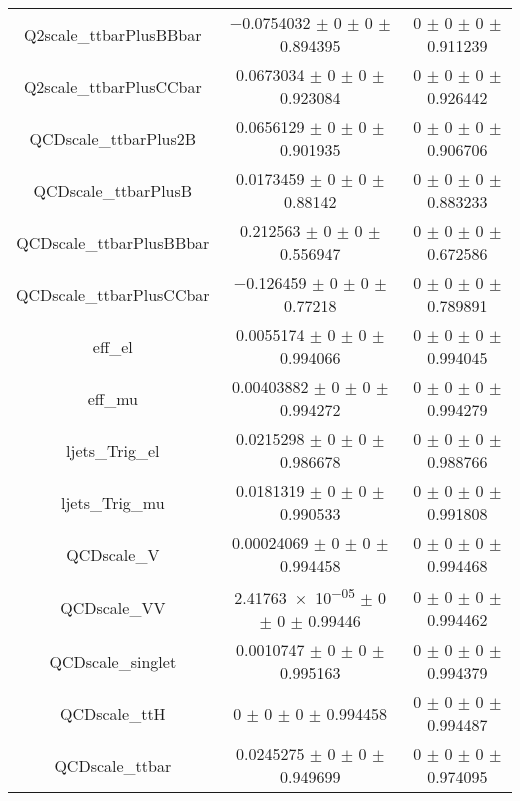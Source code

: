 \begin{table}
\begin{tabular}{ccc}
Q2scale\_ttbarPlusBBbar & \num{-0.0754032} $\pm$ \num{0} $\pm$ \num{0} $\pm$ \num{0.894395} & \num{0} $\pm$ \num{0} $\pm$ \num{0} $\pm$ \num{0.911239}\\
Q2scale\_ttbarPlusCCbar & \num{0.0673034} $\pm$ \num{0} $\pm$ \num{0} $\pm$ \num{0.923084} & \num{0} $\pm$ \num{0} $\pm$ \num{0} $\pm$ \num{0.926442}\\
QCDscale\_ttbarPlus2B & \num{0.0656129} $\pm$ \num{0} $\pm$ \num{0} $\pm$ \num{0.901935} & \num{0} $\pm$ \num{0} $\pm$ \num{0} $\pm$ \num{0.906706}\\
QCDscale\_ttbarPlusB & \num{0.0173459} $\pm$ \num{0} $\pm$ \num{0} $\pm$ \num{0.88142} & \num{0} $\pm$ \num{0} $\pm$ \num{0} $\pm$ \num{0.883233}\\
QCDscale\_ttbarPlusBBbar & \num{0.212563} $\pm$ \num{0} $\pm$ \num{0} $\pm$ \num{0.556947} & \num{0} $\pm$ \num{0} $\pm$ \num{0} $\pm$ \num{0.672586}\\
QCDscale\_ttbarPlusCCbar & \num{-0.126459} $\pm$ \num{0} $\pm$ \num{0} $\pm$ \num{0.77218} & \num{0} $\pm$ \num{0} $\pm$ \num{0} $\pm$ \num{0.789891}\\
eff\_el & \num{0.0055174} $\pm$ \num{0} $\pm$ \num{0} $\pm$ \num{0.994066} & \num{0} $\pm$ \num{0} $\pm$ \num{0} $\pm$ \num{0.994045}\\
eff\_mu & \num{0.00403882} $\pm$ \num{0} $\pm$ \num{0} $\pm$ \num{0.994272} & \num{0} $\pm$ \num{0} $\pm$ \num{0} $\pm$ \num{0.994279}\\
ljets\_Trig\_el & \num{0.0215298} $\pm$ \num{0} $\pm$ \num{0} $\pm$ \num{0.986678} & \num{0} $\pm$ \num{0} $\pm$ \num{0} $\pm$ \num{0.988766}\\
ljets\_Trig\_mu & \num{0.0181319} $\pm$ \num{0} $\pm$ \num{0} $\pm$ \num{0.990533} & \num{0} $\pm$ \num{0} $\pm$ \num{0} $\pm$ \num{0.991808}\\
QCDscale\_V & \num{0.00024069} $\pm$ \num{0} $\pm$ \num{0} $\pm$ \num{0.994458} & \num{0} $\pm$ \num{0} $\pm$ \num{0} $\pm$ \num{0.994468}\\
QCDscale\_VV & \num{2.41763e-05} $\pm$ \num{0} $\pm$ \num{0} $\pm$ \num{0.99446} & \num{0} $\pm$ \num{0} $\pm$ \num{0} $\pm$ \num{0.994462}\\
QCDscale\_singlet & \num{0.0010747} $\pm$ \num{0} $\pm$ \num{0} $\pm$ \num{0.995163} & \num{0} $\pm$ \num{0} $\pm$ \num{0} $\pm$ \num{0.994379}\\
QCDscale\_ttH & \num{0} $\pm$ \num{0} $\pm$ \num{0} $\pm$ \num{0.994458} & \num{0} $\pm$ \num{0} $\pm$ \num{0} $\pm$ \num{0.994487}\\
QCDscale\_ttbar & \num{0.0245275} $\pm$ \num{0} $\pm$ \num{0} $\pm$ \num{0.949699} & \num{0} $\pm$ \num{0} $\pm$ \num{0} $\pm$ \num{0.974095}\\

\end{tabular}
\end{table}
